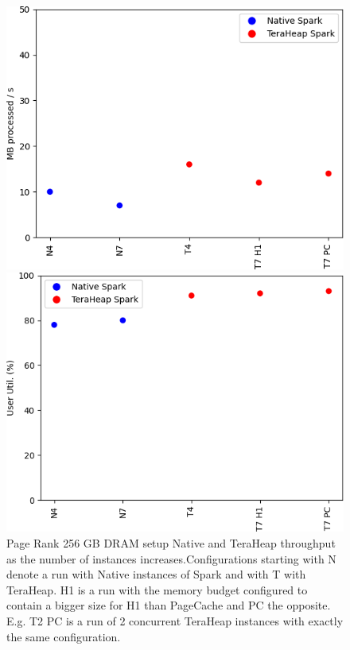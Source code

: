 \begin{figure}[thbp]
	\centering
	\iffalse
        \includegraphics[width=\linewidth]{./fig/PR_256_THR.png}
    \caption{Page Rank 256 GB DRAM setup Native and TeraHeap
    throughput as the number of instances increases.Configurations
    starting with N denote a run with Native instances of Spark and
    with T with TeraHeap. H1 is a run with the memory budget
    configured to contain a bigger size for H1 than PageCache and PC
    the opposite. E.g. T2 PC is a run of 2 concurrent TeraHeap
    instances with exactly the same configuration. }
                \label{fig:pr_256_thr}
        \includegraphics[width=\linewidth]{./fig/PR_256_USR.png}

\end{figure}
